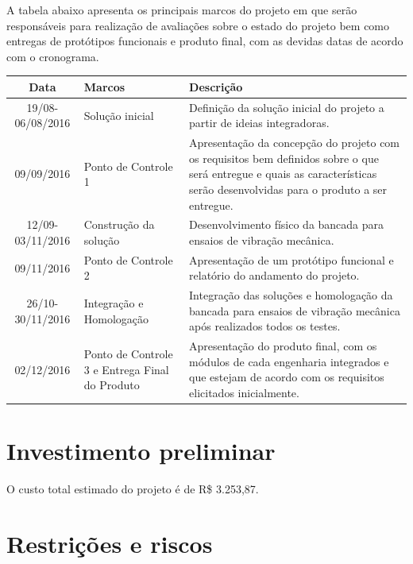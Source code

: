 \begin{apendicesenv}
	A tabela abaixo apresenta os principais marcos do projeto em que serão responsáveis para realização
    de avaliações sobre o estado do projeto bem como entregas de protótipos funcionais e produto final,
    com as devidas datas de acordo com o cronograma.

  \begin{table}[h]
  \centering
  \begin{tabular}{|c|p{4.5cm}|p{8cm}|}
	\hline
  Data & Marcos & Descrição\\
  \hline                               
  19/08-06/08/2016 & Solução inicial & Definição da solução inicial do projeto a partir de ideias integradoras.\\
  \hline                               
  09/09/2016 & Ponto de Controle 1 & Apresentação da concepção do projeto com os requisitos bem definidos 
  									sobre o que será entregue e quais as características serão 												desenvolvidas para o produto a ser entregue.\\
  \hline                               
  12/09-03/11/2016 & Construção da solução & Desenvolvimento físico da bancada para ensaios de vibração mecânica.\\
  \hline                               
  09/11/2016 & Ponto de Controle 2 & Apresentação de um protótipo funcional e relatório do 
  									andamento do projeto.\\
  \hline                               
  26/10-30/11/2016 & Integração e Homologação & Integração das soluções e homologação da bancada para ensaios de vibração mecânica após realizados todos os testes.\\
  \hline
  02/12/2016 & Ponto de Controle 3 e Entrega Final do Produto & Apresentação do produto final, com os módulos 																	de cada engenharia integrados e que 																	estejam de acordo com os requisitos 																	elicitados inicialmente.\\
  \hline
  \end{tabular}
  \end{table}


\section*{Investimento preliminar}

	O custo total estimado do projeto é de R\$ 3.253,87.

\section*{Restrições e riscos}
	

\end{apendicesenv}
